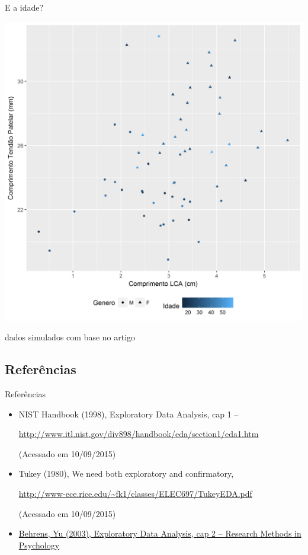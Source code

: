 \documentclass{beamer}
\begin{document}
\begin{frame}{\scriptsize E a idade?}
  \begin{center}
    \includegraphics[height=.8\textheight]{EDA/EDA-corr3}
  \end{center}

  \vfill
  \tiny
  \hfill dados simulados com base no artigo
\end{frame}

\subsection{Referências}

\begin{frame}{Referências}
  \begin{itemize}
    \tiny
  \item NIST Handbook (1998), Exploratory Data Analysis, cap 1 --

    {\tiny \url{http://www.itl.nist.gov/div898/handbook/eda/section1/eda1.htm}}

    (Acessado em 10/09/2015)
  \item Tukey (1980), We need both exploratory and confirmatory,

    {\tiny \url{http://www-ece.rice.edu/~fk1/classes/ELEC697/TukeyEDA.pdf}}

    (Acessado em 10/09/2015)
  \item \href{https://doi.org/10.1002/0471264385.wei0202}
  {Behrens, Yu (2003), Exploratory Data Analysis, cap 2 -- Research Methods in Psychology}
  \end{itemize}
\end{frame}
\end{document}
